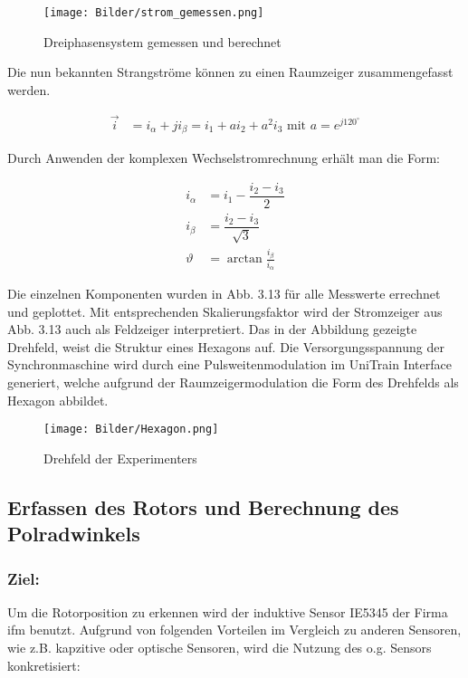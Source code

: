 \begin{figure}[H]
	\centering
	\texttt{[image: Bilder/strom\_gemessen.png]} 
	\caption{Dreiphasensystem gemessen und berechnet}
	\label{fig: Dreiphasensystem gemessen und berechnet}
\end{figure}


Die nun bekannten Strangströme können zu einen Raumzeiger zusammengefasst werden.

\begin{align*}
\vec{i}&=i_{\alpha}+ji_{\beta}=i_{1}+ai_{2}+a^{2}i_{3} \text{ mit } a = e^{j120^{\circ}}
\end{align*}

Durch Anwenden der komplexen Wechselstromrechnung erhält man die Form:

\begin{align*}
i_{\alpha}&=i_1-\dfrac{i_{2}-i_{3}}{2}\\
i_{\beta}&=\dfrac{i_{2}-i_{3}}{\sqrt{3}}\\
\vartheta&=\arctan \frac{i_{\beta}}{i_{\alpha}}
\end{align*}

Die einzelnen Komponenten wurden in Abb. 3.13 für alle Messwerte errechnet und geplottet. Mit entsprechenden Skalierungsfaktor wird der Stromzeiger aus Abb. 3.13 auch als Feldzeiger interpretiert. Das in der Abbildung gezeigte Drehfeld, weist die Struktur eines Hexagons auf. Die Versorgungsspannung der Synchronmaschine wird durch eine Pulsweitenmodulation im UniTrain Interface generiert, welche aufgrund der Raumzeigermodulation die Form des Drehfelds als Hexagon abbildet.\cite{leistungselektronik}

\begin{figure}[H]
	\centering
	\texttt{[image: Bilder/Hexagon.png]} %
	\caption{Drehfeld der Experimenters}
	\label{fig: Drehfeld der Experimenters}
\end{figure}


\subsection{Erfassen des Rotors und Berechnung des Polradwinkels}

\subsubsection{Ziel:}


Um die Rotorposition zu erkennen wird der induktive Sensor IE5345 \cite{induktiverse} der Firma ifm benutzt. Aufgrund von folgenden Vorteilen im Vergleich zu anderen Sensoren, wie z.B. kapzitive oder optische Sensoren, wird die Nutzung des o.g. Sensors konkretisiert: 

